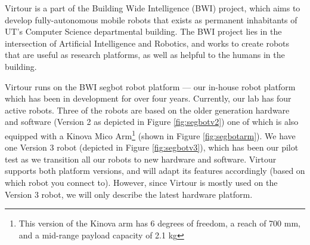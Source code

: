 \documentclass[
  oneside,
  11pt, a4paper,
  footinclude=true,
  headinclude=true,
  cleardoublepage=empty
]{article}
\begin{document}
Virtour is a part of the Building Wide Intelligence (BWI) project, which aims
to develop fully-autonomous mobile robots that exists as permanent inhabitants
of UT's Computer Science departmental building. The BWI project lies in the
intersection of Artificial Intelligence and Robotics, and works to create
robots that are useful as research platforms, as well as helpful to the humans
in the building.

Virtour runs on the BWI segbot robot platform --- our in-house robot platform
which has been in development for over four years. Currently, our lab has four
active robots. Three of the robots are based on the older generation hardware
and software (Version 2 as depicted in Figure \ref{fig:segbotv2}) one of which
is also equipped with a Kinova Mico Arm\footnote{This version of the Kinova arm
has 6 degrees of freedom, a reach of 700 mm, and a mid-range payload capacity
of 2.1 kg} (shown in Figure \ref{fig:segbotarm}). We have one Version 3 robot
(depicted in Figure \ref{fig:segbotv3}), which has been our pilot test as we
transition all our robots to new hardware and software. Virtour supports both
platform versions, and will adapt its features accordingly (based on which
robot you connect to). However, since Virtour is mostly used on the Version 3
robot, we will only describe the latest hardware platform.
\end{document}
